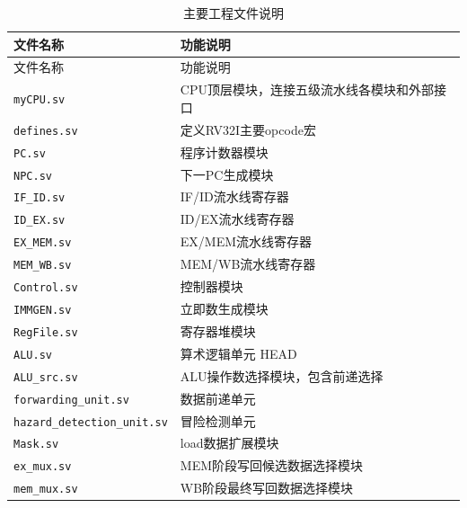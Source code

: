 \documentclass[12pt,a4paper]{ctexart}
\newcommand{\code}[1]{\texttt{#1}}
\begin{document}
\begin{longtable}{p{5cm}p{9cm}}
	\caption{主要工程文件说明}                                          \\
	\toprule
	文件名称                              & 功能说明                    \\
	\midrule
	\endfirsthead
	\toprule
	文件名称                              & 功能说明                    \\
	\midrule
	\endhead
	\code{myCPU.sv}                   & CPU顶层模块，连接五级流水线各模块和外部接口 \\
	\code{defines.sv}                 & 定义RV32I主要opcode宏        \\
	\code{PC.sv}                      & 程序计数器模块                 \\
	\code{NPC.sv}                     & 下一PC生成模块                \\
	\code{IF\_ID.sv}                  & IF/ID流水线寄存器             \\
	\code{ID\_EX.sv}                  & ID/EX流水线寄存器             \\
	\code{EX\_MEM.sv}                 & EX/MEM流水线寄存器            \\
	\code{MEM\_WB.sv}                 & MEM/WB流水线寄存器            \\
	\code{Control.sv}                 & 控制器模块                   \\
	\code{IMMGEN.sv}                  & 立即数生成模块                 \\
	\code{RegFile.sv}                 & 寄存器堆模块                  \\
	\code{ALU.sv}                     & 算术逻辑单元           HEAD       \\
	\code{ALU\_src.sv}                & ALU操作数选择模块，包含前递选择       \\
	\code{forwarding\_unit.sv}        & 数据前递单元                  \\
	\code{hazard\_detection\_unit.sv} & 冒险检测单元                  \\
	\code{Mask.sv}                    & load数据扩展模块              \\
	\code{ex\_mux.sv}                 & MEM阶段写回候选数据选择模块         \\
	\code{mem\_mux.sv}                & WB阶段最终写回数据选择模块          \\
	\bottomrule
\end{longtable}
\end{document}
